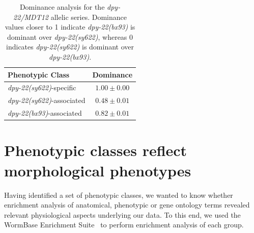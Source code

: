 \documentclass[8pt, twocolumn]{article}
\newcommand{\gene}[1]{\mbox{\emph{#1}}}
\newcommand{\dpy}[1]{\gene{dpy-22#1}}
\newcommand{\bx}{\dpy{(bx93)}}
\newcommand{\sy}{\dpy{(sy622)}}
\begin{document}
\begin{table}
  \centering
  \begin{tabular}{lc}
    \toprule
    Phenotypic Class & Dominance\\
    \midrule
    \sy{}-specific & $1.00\pm0.00$\\
    \sy{}-associated & $0.48\pm0.01$\\
    \bx{}-associated & $0.82\pm0.01$\\
    \bottomrule
  \end{tabular}
  \caption{
           Dominance analysis for the \dpy{/MDT12} allelic series. Dominance
           values closer to 1 indicate \bx{} is dominant over \sy{}, whereas 0
           indicates \sy{} is dominant over \bx{}.
          }
\label{tab:dom}
\end{table}

\section*{Phenotypic classes reflect morphological phenotypes}
Having identified a set of phenotypic classes, we wanted to know whether
enrichment analysis of anatomical, phenotypic or gene ontology terms revealed
relevant physiological aspects underlying our data. To this end, we used the
WormBase Enrichment Suite~\cite{Angeles-Albores2016} to perform enrichment
analysis of each group.
\end{document}
